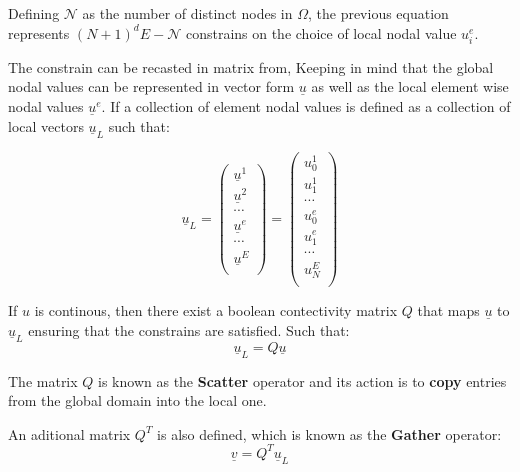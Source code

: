 \documentclass[
  a4paper,
  10pt]{article}
\begin{document}
Defining \(\mathcal{N}\) as the number of distinct nodes in \(\Omega\),
the previous equation represents \((N+1)^{d}E-\mathcal{N}\) constrains
on the choice of local nodal value \(u_{i}^{e}\).

The constrain can be recasted in matrix from, Keeping in mind that the
global nodal values can be represented in vector form \(\underline{u}\)
as well as the local element wise nodal values \(\underline{u}^{e}\). If
a collection of element nodal values is defined as a collection of local
vectors \(\underline{u}_L\) such that:

\begin{equation}
    \underline{u}_L=
    \begin{pmatrix}
    \underline{u}^{1} \\
    \underline{u}^{2} \\
    \cdots \\
    \underline{u}^{e} \\
    \cdots \\
    \underline{u}^{E} \\
    \end{pmatrix}= 
    \begin{pmatrix}
    {u}^{1}_{0} \\
    {u}^{1}_{1} \\
    \cdots \\
    {u}^{e}_{0} \\
    {u}^{e}_{1} \\
    \cdots \\
    {u}^{E}_{N} \\
    \end{pmatrix}
\end{equation}

If \(u\) is continous, then there exist a boolean contectivity matrix
\(Q\) that maps \(\underline{u}\) to \(\underline{u}_L\) ensuring that
the constrains are satisfied. Such that: \begin{equation}
    \underline{u}_L=Q\underline{u}
\end{equation}

The matrix \(Q\) is known as the \textbf{Scatter} operator and its
action is to \textbf{copy} entries from the global domain into the local
one.

An aditional matrix \(Q^{T}\) is also defined, which is known as the
\textbf{Gather} operator: \begin{equation}
    \underline{v}=Q^{T}\underline{u}_L
\end{equation}
\end{document}
